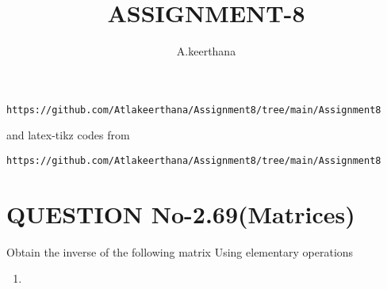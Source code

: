 \documentclass[journal,12pt,twocolumn]{IEEEtran}
\begin{document}
     \def\rightbox#1{\makebox[0in][r]{#1}}
     \def\centbox#1{\makebox[0in]{#1}}
     \def\topbox#1{\raisebox{-\baselineskip}[0in][0in]{#1}}
     \def\midbox#1{\raisebox{-0.5\baselineskip}[0in][0in]{#1}}
\vspace{3cm}
\title{ASSIGNMENT-8}
\author{A.keerthana}
\maketitle
\newpage
\bigskip
\renewcommand{\thefigure}{\theenumi}
\renewcommand{\thetable}{\theenumi}
\begin{lstlisting}
https://github.com/Atlakeerthana/Assignment8/tree/main/Assignment8
\end{lstlisting}
%
and latex-tikz codes from 
%
\begin{lstlisting}
https://github.com/Atlakeerthana/Assignment8/tree/main/Assignment8
\end{lstlisting}
%
\section{QUESTION No-2.69(Matrices)}
Obtain the inverse of the following matrix Using elementary operations
\begin{enumerate}
\item {}
\end{enumerate}
\end{document}
